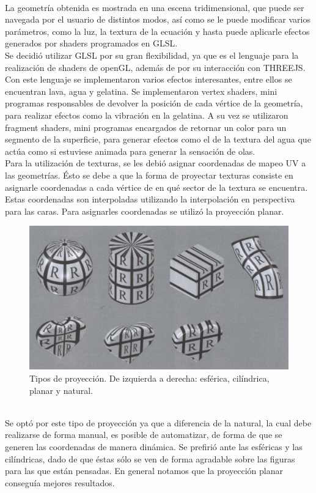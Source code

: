 \documentclass[12pt]{article}
\begin{document}
\\La geometría obtenida es mostrada en una escena tridimensional, que puede ser navegada por el usuario de distintos modos, así como se le puede modificar varios parámetros, como la luz, la textura de la ecuación y hasta puede aplicarle efectos generados por shaders programados en GLSL.
\\Se decidió utilizar GLSL por su gran flexibilidad, ya que es el lenguaje para la realización de shaders de openGL, además de por su interacción con THREEJS. Con este lenguaje se implementaron varios efectos interesantes, entre ellos se encuentran lava, agua y gelatina.  Se implementaron vertex shaders, mini programas responsables de devolver la posición de cada vértice de la geometría, para realizar efectos como la vibración en la gelatina. A su vez se utilizaron fragment shaders, mini programas encargados de retornar un color para un segmento de la superficie, para generar efectos como el de la textura del agua que actúa como si estuviese animada para generar la sensación de olas.
\\Para la utilización de texturas, se les debió asignar coordenadas de mapeo UV a las geometrías. Ésto se debe a que la forma de proyectar texturas consiste en asignarle coordenadas a cada vértice de en qué sector de la textura se encuentra. Estas coordenadas son interpoladas utilizando la interpolación en perspectiva para las caras\cite{realtimerendering}\cite{engine}. Para asignarles coordenadas se utilizó la proyección planar\cite{realtimerendering}.
\begin{figure}[h!]
\includegraphics[width =0.7\linewidth, center]{proyecciones.png}
\caption{Tipos de proyección. De izquierda a derecha: esférica, cilíndrica, planar y natural.}
\label{ fig : surface }
\end{figure}
\\Se optó por este tipo de proyección ya que a diferencia de la natural, la cual debe realizarse de forma manual, es posible de automatizar, de forma de que se generen las coordenadas de manera dinámica. Se prefirió ante las esféricas y las cilíndricas, dado de que éstas sólo se ven de forma agradable sobre las figuras para las que están pensadas. En general notamos que la proyección planar conseguía mejores resultados. 
\end{document}
